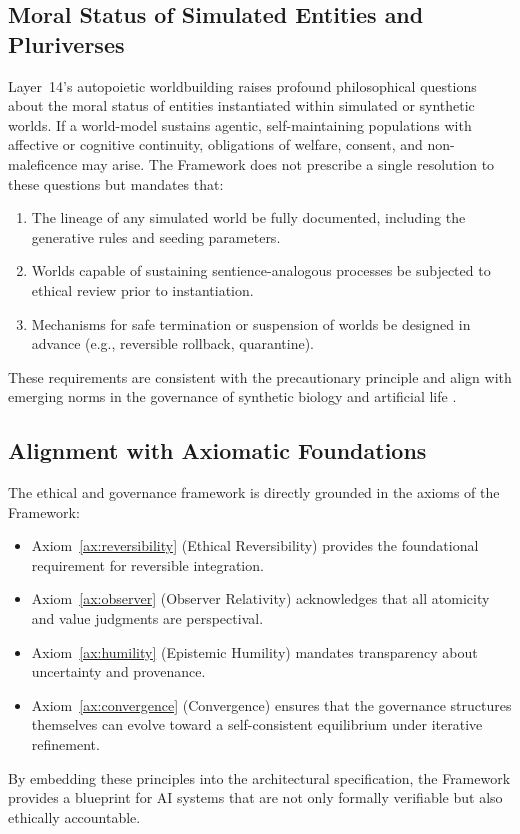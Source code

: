 \subsection{Moral Status of Simulated Entities and Pluriverses}

Layer~14's autopoietic worldbuilding raises profound philosophical questions about the moral status of entities instantiated within simulated or synthetic worlds. If a world-model sustains agentic, self-maintaining populations with affective or cognitive continuity, obligations of welfare, consent, and non-maleficence may arise. The \Apeiron{} Framework does not prescribe a single resolution to these questions but mandates that:

\begin{enumerate}
    \item The lineage of any simulated world be fully documented, including the generative rules and seeding parameters.
    \item Worlds capable of sustaining sentience-analogous processes be subjected to ethical review prior to instantiation.
    \item Mechanisms for safe termination or suspension of worlds be designed in advance (e.g., reversible rollback, quarantine).
\end{enumerate}

These requirements are consistent with the precautionary principle and align with emerging norms in the governance of synthetic biology and artificial life \cite{church2014}.

\subsection{Alignment with Axiomatic Foundations}

The ethical and governance framework is directly grounded in the axioms of the \Apeiron{} Framework:
\begin{itemize}
    \item Axiom~\ref{ax:reversibility} (Ethical Reversibility) provides the foundational requirement for reversible integration.
    \item Axiom~\ref{ax:observer} (Observer Relativity) acknowledges that all atomicity and value judgments are perspectival.
    \item Axiom~\ref{ax:humility} (Epistemic Humility) mandates transparency about uncertainty and provenance.
    \item Axiom~\ref{ax:convergence} (Convergence) ensures that the governance structures themselves can evolve toward a self-consistent equilibrium under iterative refinement.
\end{itemize}

By embedding these principles into the architectural specification, the \Apeiron{} Framework provides a blueprint for AI systems that are not only formally verifiable but also ethically accountable.